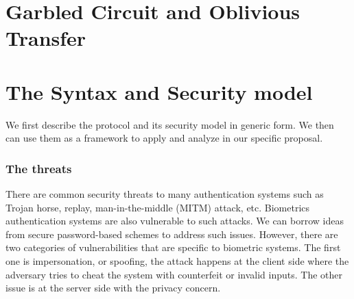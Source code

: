 \begin{description}
\begin{enumerate}
  \end{enumerate}
\end{description}

\section{Garbled Circuit and Oblivious Transfer}
\label{sec:defMPP}

\section{The Syntax and Security model}
\label{sec:syntaxModel}
We first describe the protocol and its security model in generic form.  We then can use them as a framework to apply and
analyze in our specific proposal.

\subsubsection{The threats}
\label{sec:privacyReqs}
There are common security threats to many authentication systems such as Trojan horse, replay, man-in-the-middle (MITM)
attack, etc. Biometrics authentication systems are also vulnerable to such attacks. We can
borrow ideas from secure password-based schemes to address such issues. However, there are two categories of
vulnerabilities that are specific to biometric systems.  The first one is impersonation, or spoofing, the attack happens
at the client side where the adversary tries to cheat the system with counterfeit or invalid inputs.  The other issue is
at the server side with the privacy concern.

